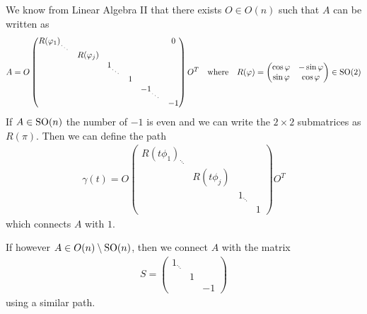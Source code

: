 \begin{enumerate}
    We know from Linear Algebra II that there exists $O \in O(n)$ such that $A$ can be written as
    \begin{align*}
      A = O \begin{pmatrix}
        R(\varphi_1)_{\ddots} &  &  &  &  & 0\\
                           & R(\varphi_j) &  &  &  & \\
       &  & 1_{\ddots} &  &  & \\
       &  &  & 1 &  & \\
       &  &  &  & -1_{\ddots} & \\
       &  &  &  &  & -1
      \end{pmatrix}
      O^{T}
      \quad \text{where} \quad R(\varphi) = \begin{pmatrix}
      \cos \varphi & - \sin \varphi\\
      \sin \varphi & \cos \varphi
    \end{pmatrix} \in \operatorname{SO}(2)
    \end{align*}
    If $A \in \operatorname{SO}(n)$ the number of $-1$ is even and we can write the $2 \times 2$ submatrices as $R(\pi)$. Then we can define the path
    \begin{align*}
      \gamma(t) = O \begin{pmatrix}
        R(t \phi_1)_{\ddots} &  &  & \\
                             & R(t \phi_j) &  & \\
       &  & 1_{\ddots} & \\
       &  &  & 1
      \end{pmatrix}
      O^{T}
    \end{align*}
    which connects $A$ with $1$.

    If however $A \in O(n) \setminus \operatorname{SO}(n)$, then we connect $A$ with the matrix 
    \begin{align*}
      S = \begin{pmatrix}
      1_{\ddots} &  & \\
       & 1 & \\
       &  & -1
      \end{pmatrix}
    \end{align*}
    using a similar path.
\end{enumerate}


